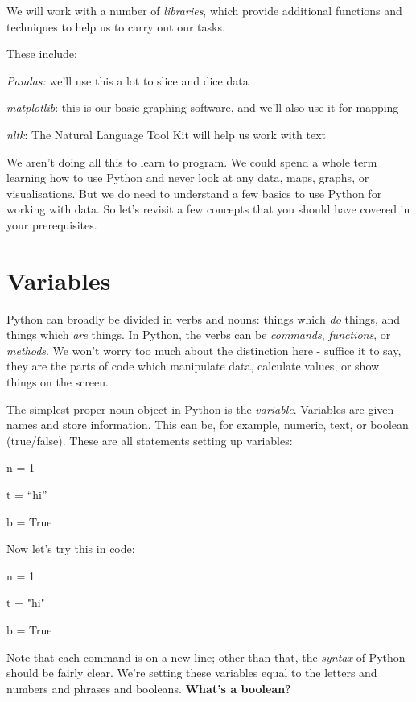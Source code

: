 \documentclass[
  letterpaper,
  DIV=11,
  numbers=noendperiod]{scrreprt}
\newenvironment{Shaded}{\begin{snugshade}}{\end{snugshade}}
\newcommand{\DecValTok}[1]{\textcolor[rgb]{0.68,0.00,0.00}{#1}}
\newcommand{\NormalTok}[1]{\textcolor[rgb]{0.00,0.23,0.31}{#1}}
\newcommand{\OperatorTok}[1]{\textcolor[rgb]{0.37,0.37,0.37}{#1}}
\newcommand{\StringTok}[1]{\textcolor[rgb]{0.13,0.47,0.30}{#1}}
\newcommand{\VariableTok}[1]{\textcolor[rgb]{0.07,0.07,0.07}{#1}}
\begin{document}
We will work with a number of \emph{libraries}, which provide additional
functions and techniques to help us to carry out our tasks.

These include:

\emph{Pandas:} we'll use this a lot to slice and dice data

\emph{matplotlib}: this is our basic graphing software, and we'll also
use it for mapping

\emph{nltk}: The Natural Language Tool Kit will help us work with text

We aren't doing all this to learn to program. We could spend a whole
term learning how to use Python and never look at any data, maps,
graphs, or visualisations. But we do need to understand a few basics to
use Python for working with data. So let's revisit a few concepts that
you should have covered in your prerequisites.

\hypertarget{variables}{%
\section{Variables}\label{variables}}

Python can broadly be divided in verbs and nouns: things which \emph{do}
things, and things which \emph{are} things. In Python, the verbs can be
\emph{commands}, \emph{functions}, or \emph{methods}. We won't worry too
much about the distinction here - suffice it to say, they are the parts
of code which manipulate data, calculate values, or show things on the
screen.

The simplest proper noun object in Python is the \emph{variable}.
Variables are given names and store information. This can be, for
example, numeric, text, or boolean (true/false). These are all
statements setting up variables:

n = 1

t = ``hi''

b = True

Now let's try this in code:

\begin{Shaded}
\begin{Highlighting}[]
\NormalTok{n }\OperatorTok{=} \DecValTok{1}

\NormalTok{t }\OperatorTok{=} \StringTok{"hi"}

\NormalTok{b }\OperatorTok{=} \VariableTok{True}
\end{Highlighting}
\end{Shaded}

Note that each command is on a new line; other than that, the
\emph{syntax} of Python should be fairly clear. We're setting these
variables equal to the letters and numbers and phrases and booleans.
\textbf{What's a boolean?}
\end{document}
